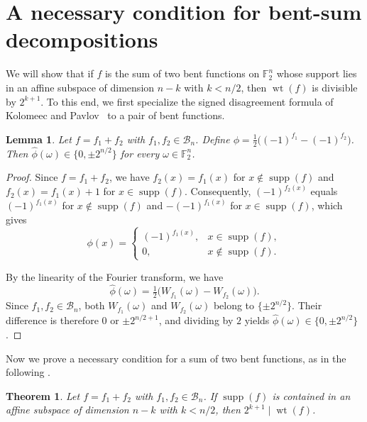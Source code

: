 \documentclass{amsart}
\numberwithin{equation}{section}
\theoremstyle{plain}
\newtheorem{theorem}[equation]{Theorem}
\newtheorem{lemma}[equation]{Lemma}
\theoremstyle{definition}
\theoremstyle{remark}
\DeclareMathOperator{\wt}{wt}
\DeclareMathOperator{\supp}{supp}
\newcommand{\F}{\mathbb{F}_2}
\newcommand{\B}{\mathcal{B}}
\begin{document}
\section{A necessary condition for bent-sum decompositions}
\label{sec:congruence}
We will show that if $f$ is the sum of two bent functions on $\F^n$ whose support lies in an affine subspace of dimension $n - k$ with $k<n/2$, then $\wt(f)$ is divisible by $2^{k+1}$. To this end, we first specialize the signed disagreement formula of Kolomeec and Pavlov~\cite{kolomeecpavlov2009} to a pair of bent functions.

\begin{lemma}
\label{lem:sign-restriction}
Let $f = f_1 + f_2$ with $f_1, f_2 \in \B_n$. Define $\phi = \tfrac{1}{2}\bigl((-1)^{f_1} - (-1)^{f_2}\bigr)$. Then $\widehat{\phi}(\omega) \in \{0, \pm 2^{n/2}\}$ for every $\omega \in \F^n$.
\end{lemma}

\begin{proof}
Since $f = f_1 + f_2$, we have $f_2(x) = f_1(x)$ for $x \notin \supp(f)$ and $f_2(x) = f_1(x) + 1$ for $x \in \supp(f)$. Consequently, $(-1)^{f_2(x)}$ equals $(-1)^{f_1(x)}$ for $x \notin \supp(f)$ and $-(-1)^{f_1(x)}$ for $x \in \supp(f)$, which gives
\[
  \phi(x) =
  \begin{cases}
    (-1)^{f_1(x)}, & x \in \supp(f), \\
    0, & x \notin \supp(f).
  \end{cases}
\]

By the linearity of the Fourier transform, we have
\[
  \widehat{\phi}(\omega) = \tfrac{1}{2}\bigl(W_{f_1}(\omega) - W_{f_2}(\omega)\bigr).
\]
Since $f_1, f_2 \in \B_n$, both $W_{f_1}(\omega)$ and $W_{f_2}(\omega)$ belong to $\{\pm 2^{n/2}\}$. Their difference is therefore $0$ or $\pm 2^{n/2+1}$, and dividing by $2$ yields $\widehat{\phi}(\omega) \in \{0, \pm 2^{n/2}\}$.
\end{proof}

Now we prove a necessary condition for a sum of two bent functions, as in the following .

\begin{theorem}
\label{thm:divisibility}
Let $f = f_1 + f_2$ with $f_1, f_2 \in \B_n$. If $\supp(f)$ is contained in an affine subspace of dimension $n - k$ with $k < n/2$, then $2^{k+1} \mid \wt(f)$.
\end{theorem}
\end{document}
